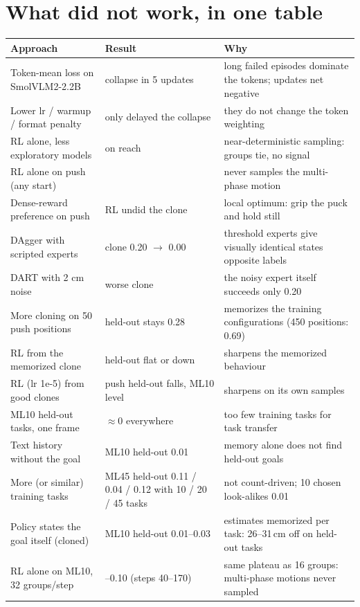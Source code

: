 \documentclass[11pt]{article}
\begin{document}
\section{What did not work, in one table}
{\centering\small
\begin{tabular}{>{\raggedright\arraybackslash}p{4.4cm}>{\raggedright\arraybackslash}p{3.6cm}>{\raggedright\arraybackslash}p{7.2cm}}
\toprule
Approach & Result & Why \\
\midrule
Token-mean loss on SmolVLM2-2.2B & collapse in 5 updates & long failed episodes dominate the tokens; updates net negative \\
Lower lr / warmup / format penalty & only delayed the collapse & they do not change the token weighting \\
RL alone, less exploratory models & 0 on reach & near-deterministic sampling: groups tie, no signal \\
RL alone on push (any start) & 0 & never samples the multi-phase motion \\
Dense-reward preference on push & RL undid the clone & local optimum: grip the puck and hold still \\
DAgger with scripted experts & clone 0.20 $\to$ 0.00 & threshold experts give visually identical states opposite labels \\
DART with 2 cm noise & worse clone & the noisy expert itself succeeds only 0.20 \\
More cloning on 50 push positions & held-out stays 0.28 & memorizes the training configurations (450 positions: 0.69) \\
RL from the memorized clone & held-out flat or down & sharpens the memorized behaviour \\
RL (lr 1e-5) from good clones & push held-out falls, ML10 level & sharpens on its own samples \\
ML10 held-out tasks, one frame & $\approx$0 everywhere & too few training tasks for task transfer \\
Text history without the goal & ML10 held-out 0.01 & memory alone does not find held-out goals \\
More (or similar) training tasks & ML45 held-out 0.11 / 0.04 / 0.12 with 10 / 20 / 45 tasks & not count-driven; 10 chosen look-alikes 0.01 \\
Policy states the goal itself (cloned) & ML10 held-out 0.01--0.03 & estimates memorized per task: 26--31\,cm off on held-out tasks \\
RL alone on ML10, 32 groups/step & 0.08--0.10 (steps 40--170) & same plateau as 16 groups: multi-phase motions never sampled \\
\bottomrule
\end{tabular}\par}
\end{document}
